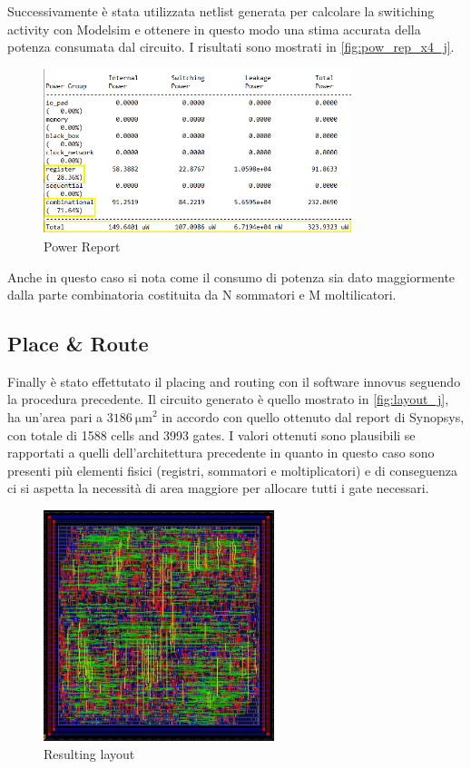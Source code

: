 Successivamente è stata utilizzata netlist generata per calcolare la switiching activity con Modelsim e ottenere in questo modo una stima accurata della potenza consumata dal circuito. I risultati sono mostrati in \autoref{fig:pow_rep_x4_j}.

\begin{figure}[h]
	\center
	\includegraphics[width=0.8\textwidth]{images/report_power_x4_j_mod.png}
	\caption{Power Report}
	\label{fig:pow_rep_x4_j}
\end{figure}

Anche in questo caso si nota come il consumo di potenza sia dato maggiormente dalla parte combinatoria costituita da N sommatori e M moltilicatori.

\subsection{Place \& Route}
Finally è stato effettutato il placing and routing con il software innovus seguendo la procedura precedente. Il circuito generato è quello mostrato in \autoref{fig:layout_j}, ha un'area pari a $\SI{3186}{\micro\meter}^2$ in accordo con quello ottenuto dal report di Synopsys, con totale di 1588 cells and 3993 gates. I valori ottenuti sono plausibili se rapportati a quelli dell'architettura precedente in quanto in questo caso sono presenti più elementi fisici (registri, sommatori e moltiplicatori) e di conseguenza ci si aspetta la necessità di area maggiore per allocare tutti i gate necessari.

\begin{figure}[h]
	\center
	\includegraphics[width=0.6\textwidth]{images/IIR_filter_period_min_x4_place_j.jpg}
	\caption{Resulting layout}
	\label{fig:layout_j}
\end{figure}

